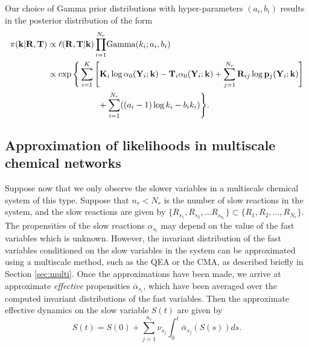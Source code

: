 Our choice of Gamma prior distributions with hyper-parameters $(a_i, b_i)$ results in the posterior distribution of the form
\begin{align}
	\pi(\mathbf{k}|\mathbf{R}, \mathbf{T}) &\propto \ell(\mathbf{R}, \mathbf{T}|\mathbf{k})
	\prod_{i=1}^{N_r} \! \text{Gamma}(k_i; a_i, b_i) \notag \\
		&\propto \exp\Bigg\{\sum\limits_{i=1}^K \Bigg[
				\mathbf{K}_i\log \alpha_0(\mathbf{Y}_i; \mathbf{k}) - \mathbf{T}_i\alpha_0(\mathbf{Y}_i; \mathbf{k}) %
				+\sum_{j=1}^{N_r} \mathbf{R}_{ij}\log\mathbf{p}_j(\mathbf{Y}_i; \mathbf{k})
			\Bigg]  \notag\\
		&	\qquad\qquad\qquad{} + \sum_{i=1}^{N_r} ((a_i-1)\log k_i - b_ik_i)\Bigg\}. \label{eqn:chem_posterior}
\end{align}

\subsection{Approximation of likelihoods in multiscale chemical
  networks}
Suppose now that we only observe the slower variables in a
multiscale chemical system of this type. Suppose that $n_r < N_r$ is the number of slow
reactions in the system, and the slow reactions are given by $\{R_{s_1},
R_{s_2}, \ldots R_{s_{n_r}} \} \subset \{R_1, R_2, \ldots , R_{N_r}
\}$. The propensities of the slow
reactions $\alpha_{s_i}$ may depend on the value of the fast variables which is
unknown. However, the invariant distribution of the fast variables
conditioned on the slow variables in the system can be approximated
using a multiscale method, such as the QEA or the CMA, as described
briefly in Section \ref{sec:multi}. Once the approximations have been
made, we arrive at approximate \emph{effective} propensities $\bar{\alpha}_{s_i}$, which
have been averaged over the computed invariant distributions of the
fast variables. Then the approximate effective dynamics on the slow variable $S(t)$ are given by 
\begin{equation}\label{eq:RTCS}
S(t) = S(0) + \sum_{j=1}^{n_r} \nu_{s_j} \int_0^t \bar{\alpha}_{s_j}(S(s)) ds.
\end{equation}

